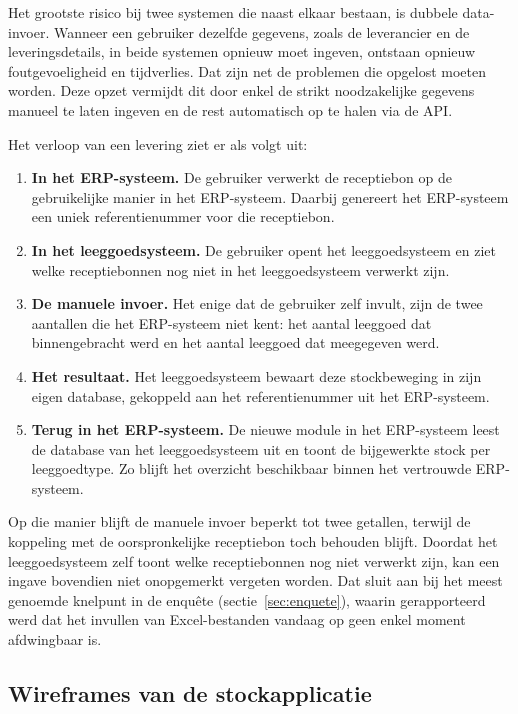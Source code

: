 Het grootste risico bij twee systemen die naast elkaar bestaan, is dubbele data-invoer. Wanneer een gebruiker dezelfde gegevens, zoals de leverancier en de leveringsdetails, in beide systemen opnieuw moet ingeven, ontstaan opnieuw foutgevoeligheid en tijdverlies. Dat zijn net de problemen die opgelost moeten worden. Deze opzet vermijdt dit door enkel de strikt noodzakelijke gegevens manueel te laten ingeven en de rest automatisch op te halen via de API.

Het verloop van een levering ziet er als volgt uit:

\begin{enumerate}
    \item \textbf{In het ERP-systeem.} De gebruiker verwerkt de receptiebon op de gebruikelijke manier in het ERP-systeem. Daarbij genereert het ERP-systeem een uniek referentienummer voor die receptiebon.
    \item \textbf{In het leeggoedsysteem.} De gebruiker opent het leeggoedsysteem en ziet welke receptiebonnen nog niet in het leeggoedsysteem verwerkt zijn.
    \item \textbf{De manuele invoer.} Het enige dat de gebruiker zelf invult, zijn de twee aantallen die het ERP-systeem niet kent: het aantal leeggoed dat binnengebracht werd en het aantal leeggoed dat meegegeven werd.
    \item \textbf{Het resultaat.} Het leeggoedsysteem bewaart deze stockbeweging in zijn eigen database, gekoppeld aan het referentienummer uit het ERP-systeem.
    \item \textbf{Terug in het ERP-systeem.} De nieuwe module in het ERP-systeem leest de database van het leeggoedsysteem uit en toont de bijgewerkte stock per leeggoedtype. Zo blijft het overzicht beschikbaar binnen het vertrouwde ERP-systeem.
\end{enumerate}

Op die manier blijft de manuele invoer beperkt tot twee getallen, terwijl de koppeling met de oorspronkelijke receptiebon toch behouden blijft. Doordat het leeggoedsysteem zelf toont welke receptiebonnen nog niet verwerkt zijn, kan een ingave bovendien niet onopgemerkt vergeten worden. Dat sluit aan bij het meest genoemde knelpunt in de enquête (sectie~\ref{sec:enquete}), waarin gerapporteerd werd dat het invullen van Excel-bestanden vandaag op geen enkel moment afdwingbaar is.

\subsection{Wireframes van de stockapplicatie}

